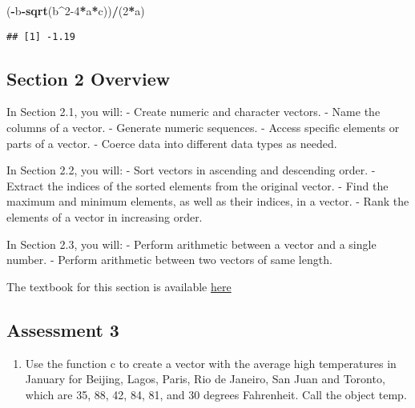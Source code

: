 \documentclass[
]{article}
\newenvironment{Shaded}{\begin{snugshade}}{\end{snugshade}}
\newcommand{\DecValTok}[1]{\textcolor[rgb]{0.00,0.00,0.81}{#1}}
\newcommand{\KeywordTok}[1]{\textcolor[rgb]{0.13,0.29,0.53}{\textbf{#1}}}
\newcommand{\NormalTok}[1]{#1}
\newcommand{\OperatorTok}[1]{\textcolor[rgb]{0.81,0.36,0.00}{\textbf{#1}}}
\providecommand{\tightlist}{%
  \setlength{\itemsep}{0pt}\setlength{\parskip}{0pt}}
\begin{document}
\begin{Shaded}
\begin{Highlighting}[]
\NormalTok{(}\OperatorTok{-}\NormalTok{b}\OperatorTok{-}\KeywordTok{sqrt}\NormalTok{(b}\OperatorTok{^}\DecValTok{2-4}\OperatorTok{*}\NormalTok{a}\OperatorTok{*}\NormalTok{c))}\OperatorTok{/}\NormalTok{(}\DecValTok{2}\OperatorTok{*}\NormalTok{a)}
\end{Highlighting}
\end{Shaded}

\begin{verbatim}
## [1] -1.19
\end{verbatim}

\hypertarget{section-2-overview}{%
\subsection{Section 2 Overview}\label{section-2-overview}}

In Section 2.1, you will: - Create numeric and character vectors. - Name
the columns of a vector. - Generate numeric sequences. - Access specific
elements or parts of a vector. - Coerce data into different data types
as needed.

In Section 2.2, you will: - Sort vectors in ascending and descending
order. - Extract the indices of the sorted elements from the original
vector. - Find the maximum and minimum elements, as well as their
indices, in a vector. - Rank the elements of a vector in increasing
order.

In Section 2.3, you will: - Perform arithmetic between a vector and a
single number. - Perform arithmetic between two vectors of same length.

The textbook for this section is available
\href{https://rafalab.github.io/dsbook/r-basics.html\#vectors}{here}

\hypertarget{assessment-3}{%
\subsection{Assessment 3}\label{assessment-3}}

\begin{enumerate}
\def\labelenumi{\arabic{enumi}.}
\tightlist
\item
  Use the function c to create a vector with the average high
  temperatures in January for Beijing, Lagos, Paris, Rio de Janeiro, San
  Juan and Toronto, which are 35, 88, 42, 84, 81, and 30 degrees
  Fahrenheit. Call the object temp.
\end{enumerate}
\end{document}
